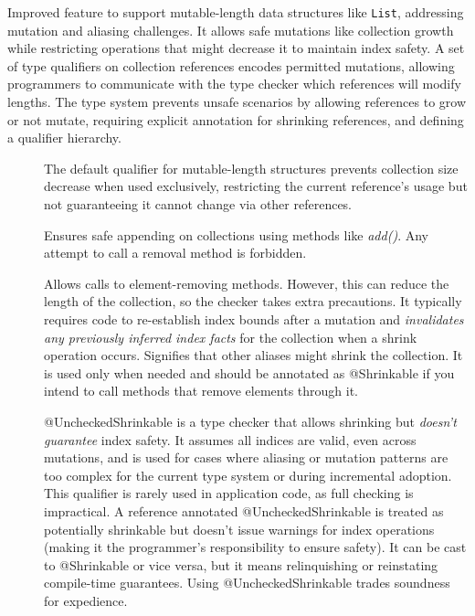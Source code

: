 Improved feature to support mutable-length data structures like {\tt List}, addressing mutation
and aliasing challenges. It allows safe mutations like collection growth while restricting
operations that might decrease it to maintain index safety. A set of type qualifiers on
collection references encodes permitted mutations, allowing programmers to communicate with the
type checker which references will modify lengths. The type system prevents unsafe scenarios by
allowing references to grow or not mutate, requiring explicit annotation for shrinking references,
and defining a qualifier hierarchy.

\begin{description}
\item[]
  The default qualifier for mutable-length structures prevents collection size decrease when used
  exclusively, restricting the current reference's usage but not guaranteeing it cannot change
  via other references.

\item[]
  Ensures safe appending on collections using methods like \emph{add()}. Any attempt to
  call a removal method is forbidden.

\item[]
  Allows calls to element-removing methods.
  However, this can reduce the length of the collection, so the checker takes extra precautions.
  It typically requires code to re-establish index bounds after a mutation and
  \emph{invalidates any previously inferred index facts} for the collection when a shrink operation occurs.
  Signifies that other aliases might shrink the collection.
  It is used only when needed and should be annotated as @Shrinkable if you intend to call methods that
  remove elements through it.

\item[]
  @UncheckedShrinkable is a type checker that allows shrinking but \emph{doesn't guarantee} index safety.
  It assumes all indices are valid, even across mutations, and is used for cases where aliasing or
  mutation patterns are too complex for the current type system or during incremental adoption.
  This qualifier is rarely used in application code, as full checking is impractical. A reference
  annotated @UncheckedShrinkable is treated as potentially shrinkable but doesn't issue warnings for
  index operations (making it the programmer’s responsibility to ensure safety). It can be cast to
  @Shrinkable or vice versa, but it means relinquishing or reinstating compile-time guarantees.
  Using @UncheckedShrinkable trades soundness for expedience.
\end{description}

